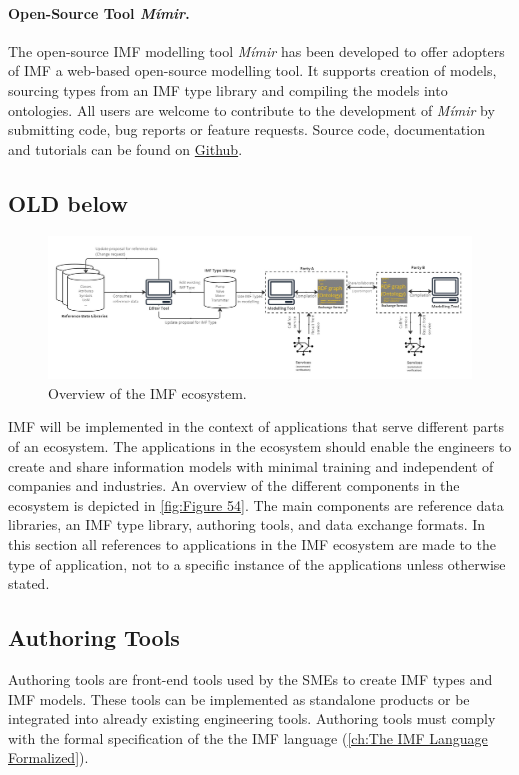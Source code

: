 \paragraph{Open-Source Tool \emph{Mímir}.}

The open-source IMF modelling tool \emph{Mímir} has been developed to offer adopters of IMF a web-based open-source
modelling tool. It supports creation of models, sourcing types from an IMF type library and compiling the models into
ontologies. All users are welcome to contribute to the development of \emph{Mímir} by submitting code, bug reports
or feature requests. Source code, documentation and tutorials can be found on
\href{https://github.com/mimir-org/mimir}{Github}.


\subsection{OLD below}

\begin{figure}[htb]
  \includegraphics[width=1\textwidth]{img/IMFmanual-img072.jpg}
  \caption{Overview of the IMF ecosystem.}
  \label{fig:Figure 54}
\end{figure}


IMF will be implemented in the context of applications that serve
different parts of an ecosystem. The applications in the ecosystem should enable the engineers to create and
share information models with minimal training and independent of companies and industries. An overview of the
different components in the ecosystem is depicted in \autoref{fig:Figure 54}. The main components are reference data libraries, an IMF type library,
authoring tools, and data exchange formats. In this section all references to applications in the IMF ecosystem are
made to the type of application, not to a specific instance of the applications unless otherwise stated.


\subsection{Authoring Tools}

Authoring tools are front-end tools used by the SMEs to create IMF types and IMF
models. These tools can be implemented as standalone products or be integrated into already existing engineering
tools. 
Authoring tools must comply with the formal specification of the the IMF language (\autoref{ch:The IMF Language Formalized}).




